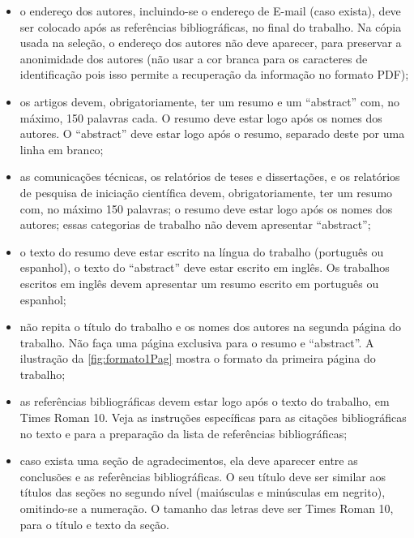 \documentclass{anpet}
\begin{document}
\begin{itemize}
\item o endereço dos autores, incluindo-se o endereço de E-mail (caso exista), deve ser colocado após as referências bibliográficas, no final do trabalho. Na cópia usada na seleção, o endereço dos autores não deve aparecer, para preservar a anonimidade dos autores (não usar a cor branca para os caracteres de identificação pois isso permite a recuperação da informação no formato PDF);

\item os artigos devem, obrigatoriamente, ter um resumo e um “abstract” com, no máximo, 150 palavras cada. O resumo deve estar logo após os nomes dos autores. O “abstract” deve estar logo após o resumo, separado deste por uma linha em branco;

\item as comunicações técnicas, os relatórios de teses e dissertações, e os relatórios de pesquisa de iniciação científica devem, obrigatoriamente, ter um resumo com, no máximo 150 palavras; o resumo deve estar logo após os nomes dos autores; essas categorias de trabalho não devem apresentar “abstract”;

\item o texto do resumo deve estar escrito na língua do trabalho (português ou espanhol), o texto do “abstract” deve estar escrito em inglês. Os trabalhos escritos em inglês devem apresentar um resumo escrito em português ou espanhol;

\item não repita o título do trabalho e os nomes dos autores na segunda página do trabalho. Não faça uma página exclusiva para o resumo e “abstract”. A ilustração da \autoref{fig:formato1Pag} mostra o formato da primeira página do trabalho;

\item as referências bibliográficas devem estar logo após o texto do trabalho, em Times Roman 10. Veja as instruções específicas para as citações bibliográficas no texto e para a preparação da lista de referências bibliográficas;

\item caso exista uma seção de agradecimentos, ela deve aparecer entre as conclusões e as referências bibliográficas. O seu título deve ser similar aos títulos das seções no segundo nível (maiúsculas e minúsculas em negrito), omitindo-se a numeração. O tamanho das letras deve ser Times Roman 10, para o título e texto da seção.

\end{itemize}
\end{document}
